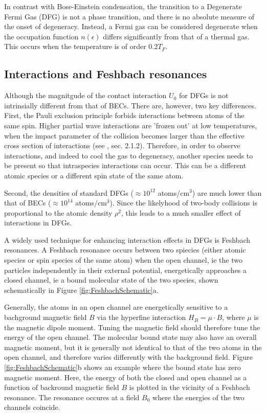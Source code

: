 In contrast with Bose-Einstein condensation, the transition to a Degenerate Fermi Gas (DFG) is not a phase transition, and there is no absolute measure of the onset of degeneracy. Instead, a Fermi gas can be considered degenerate when the occupation function $n(\epsilon)$ differs significantly from that of a thermal gas. This occurs when the temperature is of order $0.2 T_F$. 

\subsection{Interactions and Feshbach resonances}\label{sec:Feshbach}
Although the magnitgude of the contact interaction $U_0$ for DFGs is not intrinsially different from that of BECs. There are, however, two key differences. First, the Pauli exclusion principle forbids \swave{} interactions between atoms of the same spin. Higher partial wave interactions are 'frozen out' at low temperatures, when the impact parameter of the collision becomes larger than the effective cross section of interactions (see \cite{KetterleDFG}, sec. 2.1.2). Therefore, in order to observe interactions, and indeed to cool the gas to degeneracy, another species needs to be present so that intraspecies \swave{} interactions can occur. This can be a different atomic species or a different spin state of the same atom. 

Second, the densities of standard DFGs ($\approx 10^{12}$ atoms/cm$^3$) are much lower than that of BECs ($\approx 10^{14}$ atoms/cm$^3$). Since the likelyhood of two-body collisions is proportional to the atomic density $\rho^2$, this leads to a much smaller effect of interactions in DFGs.

A widely used technique for enhancing interaction effects in DFGs is Feshbach resonances. A Feshbach resonance occurs between two spiecies (either atomic species or spin species of the same atom) when the open channel, ie the two particles independently in their external potential, energetically approaches a closed channel, ie a bound molecular state of the two species, shown schematically in Figure \ref{fig:FeshbachSchematic}a. 

Generally, the atoms in an open channel are energetically sensitive to a bachground magnetic field $B$ via the hyperfine interaction $H_B=\mu\cdot B$, where $\mu$ is the magnetic dipole moment. Tuning the magnetic field should therefore tune the energy of the open channel. The molecular bound state may also have an overall magnetic moment, but it is generally not identical to that of the two atoms in the open channel, and therefore varies differently with the background field. Figure \ref{fig:FeshbachSchematic}b shows an example where the bound state has zero magnetic moment. Here, the energy of both the closed and open channel as a function of backround magnetic field $B$ is plotted in the vicinity of a Feshbach resonance. The resonance occures at a field $B_0$ where the energies of the two channels coincide.

